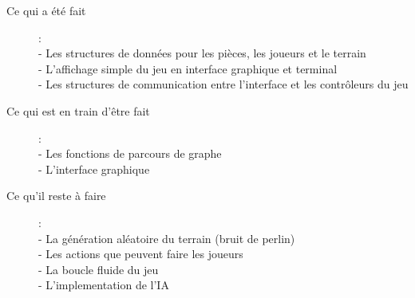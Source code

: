 \documentclass{article}
\begin{document}
\begin{description}

\item[Ce qui a été fait]: \\
- Les structures de données pour les pièces, les joueurs et le terrain\\
- L'affichage simple du jeu en interface graphique et terminal\\
- Les structures de communication entre l'interface et les contrôleurs du jeu\\

\item [Ce qui est en train d'être fait]:\\
- Les fonctions de parcours de graphe \\
- L'interface graphique

\item [Ce qu'il reste à faire]: \\
- La génération aléatoire du terrain (bruit de perlin) \\
- Les actions que peuvent faire les joueurs \\
- La boucle fluide du jeu \\
- L'implementation de l'IA \\
\end{description} 
\end{document}
